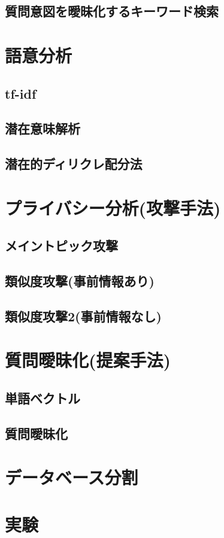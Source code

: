 \documentclass[master]{suribt}
\begin{document}
 \section{質問意図を曖昧化するキーワード検索\cite{masking2014}}
 \chapter{語意分析}
 \section{tf-idf}
 \section{潜在意味解析}
 \section{潜在的ディリクレ配分法}
 \chapter{プライバシー分析(攻撃手法)}
 \section{メイントピック攻撃}
 \section{類似度攻撃\cite{simattack2016}(事前情報あり)}
 \section{類似度攻撃2(事前情報なし)}
 \chapter{質問曖昧化(提案手法)}
 \section{単語ベクトル}
 \section{質問曖昧化}
 \chapter{データベース分割}
 \chapter{実験}
\end{document}
